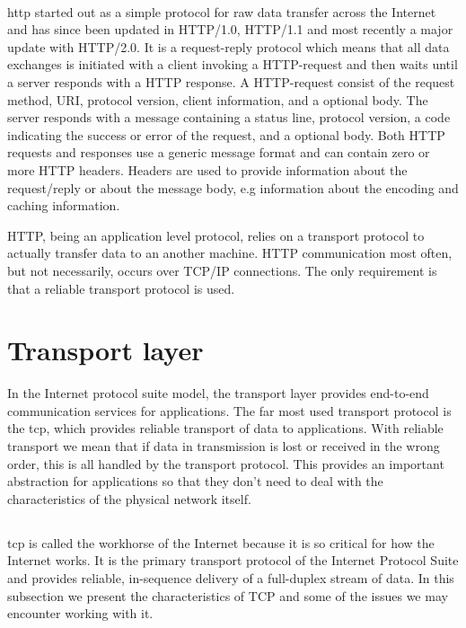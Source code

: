 \paragraph{}

\gls{http} started out as a simple protocol for raw data transfer across the
Internet and has since been updated in HTTP/1.0, HTTP/1.1 and most recently a
major update with HTTP/2.0. It is a request-reply protocol which means that all
data exchanges is initiated with a client invoking a HTTP-request and then waits
until a server responds with a HTTP response. A HTTP-request consist of the
request method, URI, protocol version, client information, and a optional body.
The server responds with a message containing a status line, protocol version, a
code indicating the success or error of the request, and a optional body. Both
HTTP requests and responses use a generic message format and can contain zero or
more HTTP headers. Headers are used to provide information about the
request/reply or about the message body, e.g information about the encoding and
caching information.

HTTP, being an application level protocol, relies on a transport protocol to
actually transfer data to an another machine. HTTP communication most often, but
not necessarily, occurs over TCP/IP connections. The only requirement is that a
reliable transport protocol is used.

\section{Transport layer}

In the Internet protocol suite model, the transport layer provides end-to-end
communication services for applications\cite{rfc-1122}. The far most used
transport protocol is the \gls{tcp}, which provides reliable transport of data
to applications. With reliable transport we mean that if data in transmission is
lost or received in the wrong order, this is all handled by the transport
protocol. This provides an important abstraction for applications so that they
don't need to deal with the characteristics of the physical network itself.

\subsection{}
\label{tcp}

\gls{tcp} is called the workhorse of the Internet because it is so critical for
how the Internet works. It is the primary transport protocol of the Internet
Protocol Suite\cite{rfc-1122} and provides reliable, in-sequence delivery of a
full-duplex stream of data. In this subsection we present the characteristics of
TCP and some of the issues we may encounter working with it.

